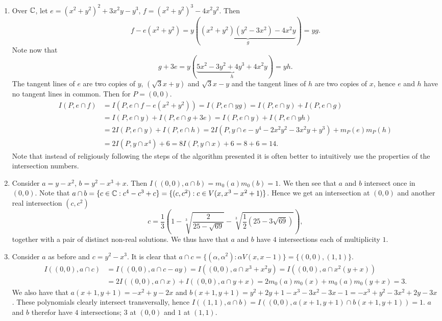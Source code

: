     \begin{example}
        \begin{enumerate}
            \item Over $\mathbb{C}$, let $e=(x^2+y^2)^2+3x^2y-y^3$, $f=(x^2+y^2)^3-4x^2y^2$. Then 
            $$f-e(x^2+y^2)=y(\underbrace{(x^2+y^2)(y^2-3x^2)-4x^2y}_g)=yg.$$
            Note now that 
            $$g+3e=y(\underbrace{5x^2-3y^2+4y^3+4x^2y}_h)=yh.$$
            The tangent lines of $e$ are two copies of $y$, $(\sqrt{3}x+y)$ and $\sqrt{3}x-y$ and the tangent lines of $h$ are two copies of $x$, hence $e$ and $h$ have no tangent lines in common. Then for $P=(0,0)$.
            \begin{align*} 
                I(P,e\cap f)&=I(P,e\cap f-e(x^2+y^2))=I(P,e\cap yg)=I(P,e\cap y)+I(P,e\cap g)\\ &= I(P,e\cap y)+I(P,e\cap g+3e)=I(P,e\cap y)+I(P,e\cap yh)\\
                &= 2I(P,e\cap y)+I(P,e\cap h)=2I(P,y\cap e-y^4-2x^2y^2-3x^2y+y^3)+m_P(e)m_P(h)\\
                &= 2I(P,y\cap x^4)+ 6 = 8I(P,y\cap x)+6=8+6=14.
            \end{align*}
            Note that instead of religiously following the steps of the algorithm presented it is often better to intuitively use the properties of the intersection numbers.
            \item Consider $a = y-x^2$, $b=y^2-x^3+x$. Then $I((0,0),a\cap b)= m_0(a)m_0(b)=1$. We then see that $a$ and $b$ intersect once in $(0,0)$. Note that $a\cap b = \{c\in \mathbb{C} : c^4-c^3+c\}=\{(c,c^2): c\in V(x,x^3-x^2+1)\}$. Hence we get an intersection at $(0,0)$ and another real intersection $(c,c^2)$  
            $$c = \frac{1}{3}\left(1-\sqrt[3]{\frac{2}{25-\sqrt{69}}}-\sqrt[3]{\frac{1}{2}(25-3\sqrt{69})} \right),$$
            together with a pair of distinct non-real solutions. We thus have that $a$ and $b$ have $4$ intersections each of multiplicity $1$. 
            \item Consider $a$ as before and $c= y^2-x^3$. It is clear that $a\cap c = \{(\alpha,\alpha^2): \alpha V(x,x-1)\}=\{ (0,0),(1,1)\}$. 
            \begin{align*} 
                I((0,0),a\cap c)&= I((0,0), a\cap c-ay) = I((0,0), a\cap x^3+x^2y)=I((0,0), a\cap x^2(y+x))\\
                &=2I((0,0),a\cap x)+I((0,0),a \cap y+x)= 2m_0(a)m_0(x) +m_0(a)m_0(y+x) = 3.
            \end{align*}
            We also have that $a(x+1,y+1)=-x^2+y-2x$ and $b(x+1,y+1)=y^2+2y+1-x^3-3x^2-3x-1= -x^3+y^2-3x^2+2y-3x$. These polynomials clearly intersect transversally, hence $I((1,1),a\cap b)=I((0,0),a(x+1,y+1)\cap b(x+1,y+1))= 1$. $a$ and $b$ therefor have $4$ intersections; $3$ at $(0,0)$ and $1$ at $(1,1)$.
         \end{enumerate}
    \end{example}
